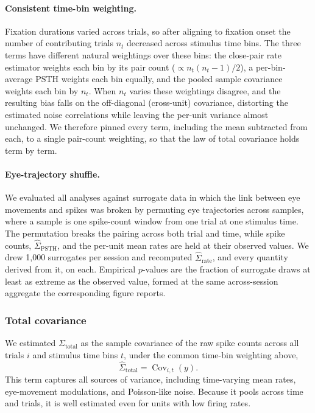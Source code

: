 \documentclass{lite}
\renewcommand{\C}{\operatorname{Cov}}
\newcommand{\Ctotal}{\Sigma_{\text{total}}}
\begin{document}
\paragraph{Consistent time-bin weighting.} Fixation durations varied across trials, so after aligning to fixation onset the number of contributing trials $n_t$ decreased across stimulus time bins. The three terms have different natural weightings over these bins: the close-pair rate estimator weights each bin by its pair count ($\propto n_t(n_t-1)/2$), a per-bin-average PSTH weights each bin equally, and the pooled sample covariance weights each bin by $n_t$. When $n_t$ varies these weightings disagree, and the resulting bias falls on the off-diagonal (cross-unit) covariance, distorting the estimated noise correlations while leaving the per-unit variance almost unchanged. We therefore pinned every term, including the mean subtracted from each, to a single pair-count weighting, so that the law of total covariance holds term by term.

\paragraph{Eye-trajectory shuffle.} We evaluated all analyses against surrogate data in which the link between eye movements and spikes was broken by permuting eye trajectories across samples, where a sample is one spike-count window from one trial at one stimulus time. The permutation breaks the pairing across both trial and time, while spike counts, $\hat{\Sigma}_{\mathrm{PSTH}}$, and the per-unit mean rates are held at their observed values. We drew 1,000 surrogates per session and recomputed $\hat{\Sigma}_{\mathrm{rate}}$, and every quantity derived from it, on each. Empirical $p$-values are the fraction of surrogate draws at least as extreme as the observed value, formed at the same across-session aggregate the corresponding figure reports.

\subsubsection{Total covariance}
We estimated $\Ctotal$ as the sample covariance of the raw spike counts across all trials $i$ and stimulus time bins $t$, under the common time-bin weighting above,
\begin{equation}
    \hat{\Sigma}_{\text{total}} = \C_{i,t}(y).
\end{equation}
This term captures all sources of variance, including time-varying mean rates, eye-movement modulations, and Poisson-like noise. Because it pools across time and trials, it is well estimated even for units with low firing rates.
\end{document}
